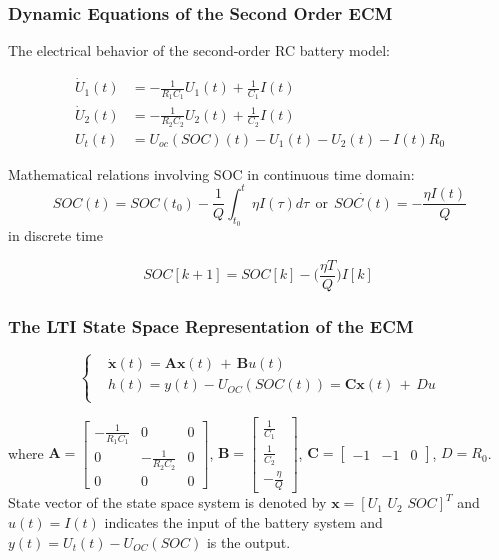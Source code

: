 \documentclass{beamer}
\begin{document}
\begin{frame}
	\frametitle{Dynamic Equations of the Second Order ECM}
	The electrical behavior of the second-order RC battery model:
	
	\begin{subequations} 
		\label{eqn:electrical_behavior_of_the_proposed_model}
		\begin{align} \dot{U}_{1}(t) &= -\frac{1}{R_{1}C_{1}}U_1(t) + \frac{1}{C_1}I(t) \\ 
			\dot{U}_{2}(t) &= -\frac{1}{R_{2}C_{2}}U_2(t) + \frac{1}{C_2}I(t) \\ 
			U_{t}(t) &= U_{oc}(SOC)(t) - {U}_{1}(t) - {U}_{2}(t) - I(t)R_{0} 
		\end{align} 
	\end{subequations}	
	
	Mathematical relations involving SOC in continuous time domain:
	\begin{equation}
		\label{eqn:SOC_in_continious_time}
		SOC(t) = SOC(t_{0}) - \frac{1}{Q}\int_{t_{0}}^{t}\eta I(\tau)d\tau~~ \text{or}~~ \dot{SOC(t)} = -\frac{\eta I(t)}{Q}
	\end{equation}
	in discrete time
	
	\begin{equation}
		\label{eqn:SOC_in_discrete_time}
		SOC[k+1] = SOC[k] - \bigg(\frac{\eta T}{Q}\bigg)I[k] \
	\end{equation}
	
\end{frame}

\begin{frame}
	\frametitle{The LTI State Space Representation of the ECM}
	\begin{equation}
		\label{eqn:continues_time_state_space}
		\begin{cases}
			& \dot{\bm{x}}(t) = \bm{A}\bm{x}(t)\,+\,\bm{B}u(t)  \\
			& h(t) = {y}(t) - U_{OC}(SOC(t)) = \bm{C}\bm{x}(t)\,+\,{D}u \\
		\end{cases}   
	\end{equation} 
	
	where $\bm{A} = \begin{bmatrix} -\frac{1}{R_{1}C_{1}} & 0 & 0  \\ 0 & -\frac{1}{R_{2}C_{2}} & 0 \\ 0 & 0 & 0 \end{bmatrix}$, $\bm{B} = \begin{bmatrix} \frac{1}{C_{1}} \\ \frac{1}{C_{2}} \\ -\frac{\eta}{Q}  \end{bmatrix}$,  $\bm{C} = \begin{bmatrix} -1 & -1 & 0 \end{bmatrix}$, $D = R_{0}$. State vector of the state space system is denoted by $\bm{x} = [U_{1}\,\,U_{2}\,\,SOC]^T$ and $u(t) = I(t)$ indicates the input of the battery system and $y(t) = U_t(t)-U_{OC}(SOC)$ is the output.
\end{frame}
\end{document}
